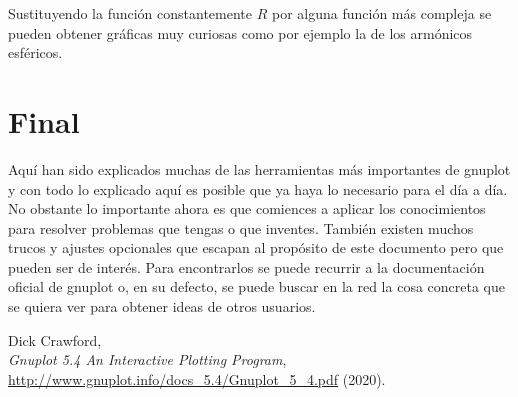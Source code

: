 \documentclass[11pt,a4paper,twoside,pdf]{article}
\numberwithin{equation}{section}
\begin{document}
Sustituyendo la función constantemente $R$ por alguna función más compleja se pueden obtener gráficas muy curiosas como por ejemplo la de los armónicos esféricos.

\section{Final}

Aquí han sido explicados muchas de las herramientas más importantes de gnuplot y con todo lo explicado aquí es posible que ya haya lo necesario para el día a día. No obstante lo importante ahora es que comiences a aplicar los conocimientos para resolver problemas que tengas o que inventes. También existen muchos trucos y ajustes opcionales que escapan al propósito de este documento pero que pueden ser de interés. Para encontrarlos se puede recurrir a la documentación oficial de gnuplot o, en su defecto, se puede buscar en la red la cosa concreta que se quiera ver para obtener ideas de otros usuarios.

\newpage


\begin{thebibliography}{100}

  Dick Crawford, \\
  {\em Gnuplot 5.4 An Interactive Plotting Program}, \\
  \url{http://www.gnuplot.info/docs_5.4/Gnuplot_5_4.pdf} (2020).
\end{thebibliography}
\end{document}
